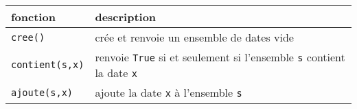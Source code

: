 \documentclass[a4paper,17pt]{extarticle}
\begin{document}
\begin{longtable}[]{@{}ll@{}}
\toprule
\begin{minipage}[b]{0.47\columnwidth}\raggedright
fonction\strut
\end{minipage} & \begin{minipage}[b]{0.47\columnwidth}\raggedright
description\strut
\end{minipage}\tabularnewline
\midrule
\endhead
\begin{minipage}[t]{0.47\columnwidth}\raggedright
\texttt{cree()}\strut
\end{minipage} & \begin{minipage}[t]{0.47\columnwidth}\raggedright
crée et renvoie un ensemble de dates vide\strut
\end{minipage}\tabularnewline
\begin{minipage}[t]{0.47\columnwidth}\raggedright
\texttt{contient(s,x)}\strut
\end{minipage} & \begin{minipage}[t]{0.47\columnwidth}\raggedright
renvoie \texttt{True} si et seulement si l'ensemble \texttt{s} contient
la date \texttt{x}\strut
\end{minipage}\tabularnewline
\begin{minipage}[t]{0.47\columnwidth}\raggedright
\texttt{ajoute(s,x)}\strut
\end{minipage} & \begin{minipage}[t]{0.47\columnwidth}\raggedright
ajoute la date \texttt{x} à l'ensemble \texttt{s}\strut
\end{minipage}\tabularnewline
\bottomrule
\end{longtable}


    
    
    
\end{document}
